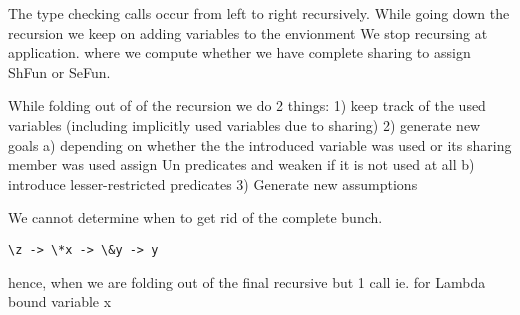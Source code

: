 
The type checking calls occur from left to right recursively.
While going down the recursion we keep on adding variables to the envionment
We stop recursing at application. where we compute whether we have complete sharing to assign ShFun or SeFun.

While folding out of of the recursion we do 2 things:
1) keep track of the used variables (including implicitly used variables due to sharing)
2) generate new goals
   a) depending on whether the the introduced variable was used
      or its sharing member was used assign Un predicates and weaken if it is not used at all
   b) introduce lesser-restricted predicates
3) Generate new assumptions

We cannot determine when to get rid of the complete bunch.
\begin{verbatim}
\z -> \*x -> \&y -> y
\end{verbatim}
hence, when we are folding out of the final recursive but 1 call ie. for Lambda bound variable x


